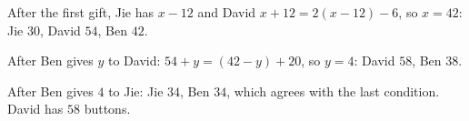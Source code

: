 After the first gift, Jie has $x-12$ and David $x+12=2(x-12)-6$, so $x=42$: Jie $30$, David $54$, Ben $42$.

After Ben gives $y$ to David: $54+y=(42-y)+20$, so $y=4$: David $58$, Ben $38$.

After Ben gives $4$ to Jie: Jie $34$, Ben $34$, which agrees with the last condition. David has $\boxed{58}$ buttons.
